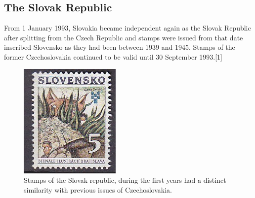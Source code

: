 \subsection{The Slovak Republic}

From 1 January 1993, Slovakia became independent again as the Slovak Republic after splitting from the Czech Republic and stamps were issued from that date inscribed Slovensko as they had been between 1939 and 1945. Stamps of the former Czechoslovakia continued to be valid until 30 September 1993.[1] 

\begin{figure}[htp]                   
\centering
\includegraphics[width=.25\textwidth]{../slovakia/scott-170.jpg}
\caption{Stamps of the Slovak republic, during the first years had a distinct similarity with previous issues of Czechoslovakia.}
\end{figure}   


